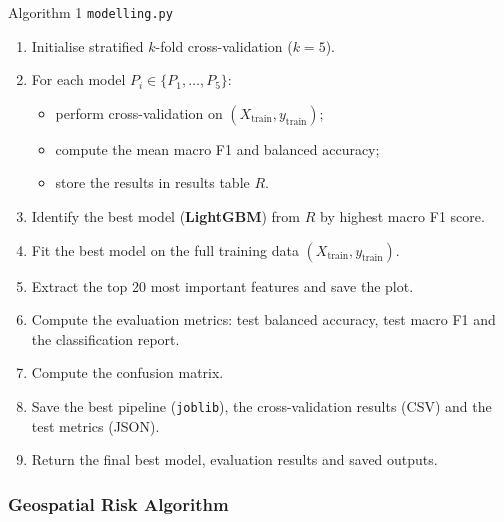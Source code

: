 \documentclass[11pt,a4paper]{article}
\begin{document}
\begin{algobox}{Algorithm 1 \quad \texttt{modelling.py}}
\begin{enumerate}[label=\arabic*.]
  \item Initialise stratified $k$-fold cross-validation ($k = 5$).
  \item For each model $P_i \in \{P_1, \dots, P_5\}$:
    \begin{itemize}
      \item perform cross-validation on $(X_{\text{train}}, y_{\text{train}})$;
      \item compute the mean macro F1 and balanced accuracy;
      \item store the results in results table $R$.
    \end{itemize}
  \item Identify the best model (\textbf{LightGBM}) from $R$ by highest macro F1 score.
  \item Fit the best model on the full training data $(X_{\text{train}}, y_{\text{train}})$.
  \item Extract the top 20 most important features and save the plot.
  \item Compute the evaluation metrics: test balanced accuracy, test macro F1 and the
        classification report.
  \item Compute the confusion matrix.
  \item Save the best pipeline (\texttt{joblib}), the cross-validation results (CSV) and the test
        metrics (JSON).
  \item Return the final best model, evaluation results and saved outputs.
\end{enumerate}
\end{algobox}

\subsubsection{Geospatial Risk Algorithm}
\end{document}
